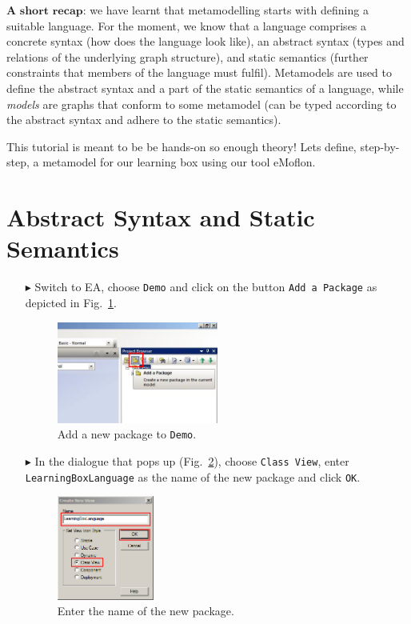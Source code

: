 $\textbf{A short recap:}$  we have learnt that metamodelling starts with defining a suitable language.  
For the moment, we know that a language comprises a concrete syntax (how does the language look like),  an abstract syntax (types and relations of the underlying graph structure), and static semantics (further constraints that members of the language must fulfil).
Metamodels are used to define the abstract syntax and a part of the static semantics of a language, while \emph{models} are graphs that conform to some
metamodel (can be typed  according to the abstract syntax and adhere to the static semantics). 

This tutorial is meant to be be hands-on so enough theory!  
Lets define, step-by-step, a metamodel for our learning box using our tool eMoflon.  
  
\section{Abstract Syntax and Static Semantics}
\label{sec:abstractSyntax}

\begin{enumerate}
\item[$\blacktriangleright$] Switch to EA, choose \texttt{Demo} and click on the button \texttt{Add a Package} as depicted in Fig.~\ref{fig:new_package}.   

\begin{figure}[htbp]
	\centering
  \includegraphics[width=0.5\textwidth]{pics/memBoxBilder/memBox01.png}
	\caption{Add a new package to \texttt{Demo}.}
	\label{fig:new_package}
\end{figure} 

\item[$\blacktriangleright$] In the dialogue that pops up (Fig.~\ref{fig:new_package_name}), choose \texttt{Class View}, enter \texttt{Learning\-Box\-Language} as the name of the new package and click \texttt{OK}. 

\begin{figure}[htbp]
	\centering
    \includegraphics[width=0.3\textwidth]{pics/memBoxBilder/memBox02.png}
	\caption{Enter the name of the new package.}
	\label{fig:new_package_name}
\end{figure}
\end{enumerate}

